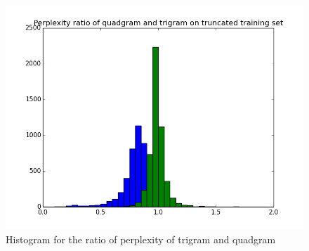 \begin{figure}
\centering  
\includegraphics[width = \linewidth]{./FIG/030/ratio}\hfill
\caption{Histogram for the ratio of perplexity of trigram and quadgram} \label{fig:ratio}
\end{figure}


